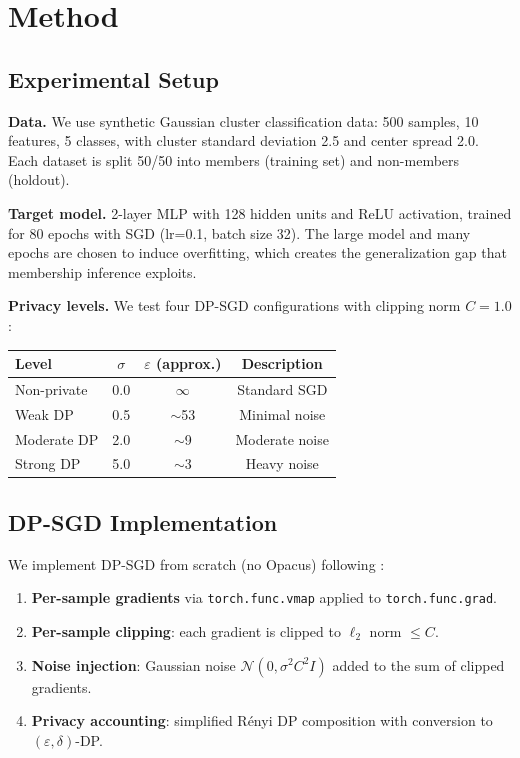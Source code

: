 \documentclass[11pt,a4paper]{article}
\begin{document}
\section{Method}

\subsection{Experimental Setup}

\textbf{Data.} We use synthetic Gaussian cluster classification data: 500 samples, 10 features, 5 classes, with cluster standard deviation 2.5 and center spread 2.0. Each dataset is split 50/50 into members (training set) and non-members (holdout).

\textbf{Target model.} 2-layer MLP with 128 hidden units and ReLU activation, trained for 80 epochs with SGD (lr=0.1, batch size 32). The large model and many epochs are chosen to induce overfitting, which creates the generalization gap that membership inference exploits.

\textbf{Privacy levels.} We test four DP-SGD configurations with clipping norm $C=1.0$:

\begin{center}
\begin{tabular}{lccc}
\toprule
Level & $\sigma$ & $\varepsilon$ (approx.) & Description \\
\midrule
Non-private & 0.0 & $\infty$ & Standard SGD \\
Weak DP & 0.5 & $\sim$53 & Minimal noise \\
Moderate DP & 2.0 & $\sim$9 & Moderate noise \\
Strong DP & 5.0 & $\sim$3 & Heavy noise \\
\bottomrule
\end{tabular}
\end{center}

\subsection{DP-SGD Implementation}

We implement DP-SGD from scratch (no Opacus) following \citet{abadi2016deep}:
\begin{enumerate}
  \item \textbf{Per-sample gradients} via \texttt{torch.func.vmap} applied to \texttt{torch.func.grad}.
  \item \textbf{Per-sample clipping}: each gradient is clipped to $\ell_2$ norm $\leq C$.
  \item \textbf{Noise injection}: Gaussian noise $\mathcal{N}(0, \sigma^2 C^2 I)$ added to the sum of clipped gradients.
  \item \textbf{Privacy accounting}: simplified R\'{e}nyi DP composition with conversion to $(\varepsilon, \delta)$-DP.
\end{enumerate}
\end{document}
